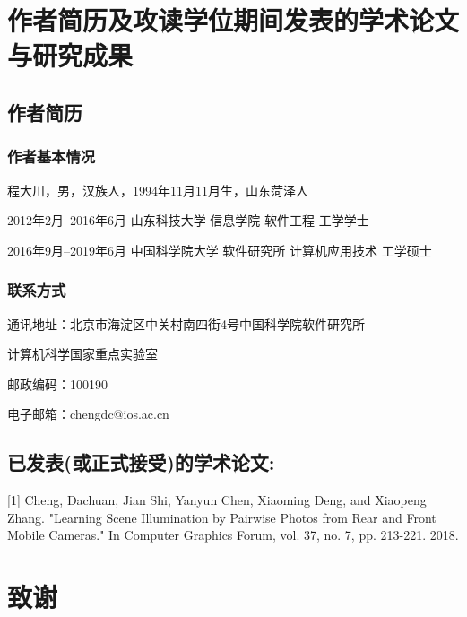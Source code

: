 \chapter{作者简历及攻读学位期间发表的学术论文与研究成果}

\section*{作者简历}

\subsection*{作者基本情况}
程大川，男，汉族人，1994年11月11月生，山东菏泽人

2012年2月--2016年6月 山东科技大学 信息学院 软件工程 工学学士

2016年9月--2019年6月 中国科学院大学 软件研究所 计算机应用技术 工学硕士

\subsection*{联系方式}
通讯地址：北京市海淀区中关村南四街4号中国科学院软件研究所

计算机科学国家重点实验室

邮政编码：100190

电子邮箱：chengdc@ios.ac.cn 

\section*{已发表(或正式接受)的学术论文:}

[1] Cheng, Dachuan, Jian Shi, Yanyun Chen, Xiaoming Deng, and Xiaopeng Zhang. "Learning Scene Illumination by Pairwise Photos from Rear and Front Mobile Cameras." In Computer Graphics Forum, vol. 37, no. 7, pp. 213-221. 2018.

\chapter[致谢]{致\quad 谢}%


